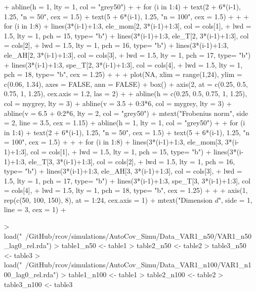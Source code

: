 \documentclass{article}
\begin{document}
\begin{Schunk}
\begin{Sinput}
{+   abline(h = 1, lty = 1, col = "grey50")
+ 
+   for (i in 1:4){
+     text(2 + 6*(i-1), 1.25, "n = 50", cex = 1.5)
+     text(5 + 6*(i-1), 1.25, "n = 100", cex = 1.5)
+   }
+ 
+   for (i in 1:8){
+     lines(3*(i-1)+1:3, ele_mom[2, 3*(i-1)+1:3], col = cols[1],
+           lwd = 1.5, lty = 1, pch = 15, type= "b")
+     lines(3*(i-1)+1:3, ele_T[2, 3*(i-1)+1:3], col = cols[2],
+           lwd = 1.5, lty = 1, pch = 16, type= "b")
+     lines(3*(i-1)+1:3, ele_AH[2, 3*(i-1)+1:3], col = cols[3],
+           lwd = 1.5, lty = 1, pch = 17, type= "b")
+     lines(3*(i-1)+1:3, spe_T[2, 3*(i-1)+1:3], col = cols[4],
+           lwd = 1.5, lty = 1, pch = 18, type= "b", cex = 1.25)
+   }
+ 
+   plot(NA, xlim = range(1,24), ylim = c(0.06, 1.34), axes = FALSE, ann = FALSE)
+   box()
+   axis(2, at = c(0.25, 0.5, 0.75, 1, 1.25), cex.axis = 1.2, las = 2)
+ 
+   abline(h = c(0.25, 0.5, 0.75, 1, 1.25), col = mygrey, lty = 3)
+   abline(v = 3.5 + 0:3*6, col = mygrey, lty = 3)
+   abline(v = 6.5 + 0:2*6, lty = 2, col = "grey50")
+   mtext("Frobenius norm", side = 2, line = 3.5, cex = 1.15)
+   abline(h = 1, lty = 1, col = "grey50")
+ 
+   for (i in 1:4){
+     text(2 + 6*(i-1), 1.25, "n = 50", cex = 1.5)
+     text(5 + 6*(i-1), 1.25, "n = 100", cex = 1.5)
+   }
+ 
+   for (i in 1:8){
+     lines(3*(i-1)+1:3, ele_mom[3, 3*(i-1)+1:3], col = cols[1],
+           lwd = 1.5, lty = 1, pch = 15, type= "b")
+     lines(3*(i-1)+1:3, ele_T[3, 3*(i-1)+1:3], col = cols[2],
+           lwd = 1.5, lty = 1, pch = 16, type= "b")
+     lines(3*(i-1)+1:3, ele_AH[3, 3*(i-1)+1:3], col = cols[3],
+           lwd = 1.5, lty = 1, pch = 17, type= "b")
+     lines(3*(i-1)+1:3, spe_T[3, 3*(i-1)+1:3], col = cols[4],
+           lwd = 1.5, lty = 1, pch = 18, type= "b", cex = 1.25)
+   }
+ 
+   axis(1, rep(c(50, 100, 150), 8), at = 1:24, cex.axis = 1)
+   mtext("Dimension $d$", side = 1, line = 3, cex = 1)
+ }
\end{Sinput}
\end{Schunk}

\begin{Schunk}
\begin{Sinput}
> load("~/GitHub/rcov/simulations/AutoCov_Simu/Data_VAR1_n50/VAR1_n50_lag0_rel.rda")
> table1_n50 <- table1
> table2_n50 <- table2
> table3_n50 <- table3
> load("~/GitHub/rcov/simulations/AutoCov_Simu/Data_VAR1_n100/VAR1_n100_lag0_rel.rda")
> table1_n100 <- table1
> table2_n100 <- table2
> table3_n100 <- table3
\end{Sinput}
\end{Schunk}
\end{document}
